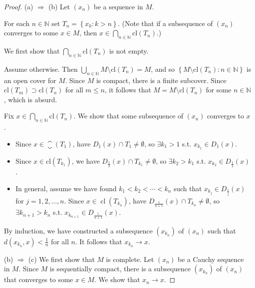 \documentclass[a4paper,11pt]{article}
\begin{document}
\begin{proof}
    (a) $\Longrightarrow$ (b) Let $\left(x_{n}\right)$ be a sequence in $M$.

For each $n \in \mathbb{N}$ set $T_{n}=\left\{x_{k}: k>n\right\}$. (Note that if a subsequence of $\left(x_{n}\right)$ converges to some $x \in M$, then $x \in \bigcap_{n \in \mathbb{N}} \mathrm{cl}\left(T_{n}\right)$.)

We first show that $\bigcap_{n \in \mathbb{N}} \mathrm{cl}\left(T_{n}\right)$ is not empty. 

Assume otherwise. Then $\bigcup_{n \in \mathbb{N}} M \setminus \mathrm{cl}\left(T_{n}\right)=M$, and so $\left\{M \setminus \mathrm{cl}\left(T_{n}\right): n \in \mathbb{N}\right\}$ is an open cover for $M$. Since $M$ is compact, there is a finite subcover. Since $\mathrm{cl}\left(T_{m}\right) \supset \mathrm{cl}\left(T_{n}\right)$ for all $m \leqslant n$, it follows that $M=M \setminus \mathrm{cl}\left(T_{n}\right)$ for some $n \in \mathbb{N}$, which is absurd.

Fix $x \in \bigcap_{n \in \mathbb{N}} \mathrm{cl}\left(T_{n}\right)$. We show that some subsequence of $\left(x_{n}\right)$ converges to $x$. 
\begin{itemize}
    \item Since $x \in \closure\left(T_{1}\right)$, have $D_{1}(x) \cap T_{1} \neq \emptyset$, so $\exists k_{1}>1$ s.t. $x_{k_{1}} \in D_{1}(x)$. 
    
    \item Since $x \in \mathrm{cl}\left(T_{k_{1}}\right)$, we have $D_{\frac{1}{2}}(x) \cap T_{k_{1}} \neq \emptyset$, so $\exists k_{2}>k_{1}$ s.t. $x_{k_{2}} \in D_{\frac{1}{2}}(x)$. 
    
    \item In general, assume we have found $k_{1}<k_{2}<\cdots<k_{n}$ such that $x_{k_{j}} \in D_{\frac{1}{j}}(x)$ for $j=1,2, \ldots, n$. Since $x \in \operatorname{cl}\left(T_{k_{n}}\right)$, have $D_{\frac{1}{n+1}}(x) \cap T_{k_{n}} \neq \emptyset$, so $\exists k_{n+1}>k_{n}$ s.t. $x_{k_{n+1}} \in D_{\frac{1}{n+1}}(x)$. 
\end{itemize}

By induction, we have constructed a subsequence $\left(x_{k_{n}}\right)$ of $\left(x_{n}\right)$ such that $d\left(x_{k_{n}}, x\right)<\frac{1}{n}$ for all $n$. It follows that $x_{k_{n}} \rightarrow x$.

(b) $\Longrightarrow$ (c) We first show that $M$ is complete. 
Let $\left(x_{n}\right)$ be a Cauchy sequence in $M$. Since $M$ is sequentially compact, there is a subsequence $\left(x_{k_{n}}\right)$ of $\left(x_{n}\right)$ that converges to some $x \in M$. We show that $x_{n} \rightarrow x$. 


\end{proof}
\end{document}
